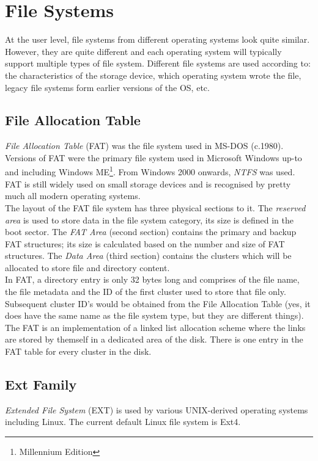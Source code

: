 \section{File Systems}
At the user level, file systems from different operating systems look quite similar. However, they are quite different and each operating system will typically support multiple types of file system. Different file systems are used according to: the characteristics of the storage device, which operating system wrote the file, legacy file systems form earlier versions of the OS, etc.

\subsection{File Allocation Table}
\textit{File Allocation Table} (FAT) was the file system used in MS-DOS (c.1980). Versions of FAT were the primary file system used in Microsoft Windows up-to and including Windows ME\footnote{Millennium Edition}. From Windows 2000 onwards, \textit{NTFS} was used. FAT is still widely used on small storage devices and is recognised by pretty much all modern operating systems.\\

The layout of the FAT file system has three physical sections to it. The \textit{reserved area} is used to store data in the file system category, its size is defined in the boot sector. The \textit{FAT Area} (second section) contains the primary and backup FAT structures; its size is calculated based on the number and size of FAT structures. The \textit{Data Area} (third section) contains the clusters which will be allocated to store file and directory content.\\

In FAT, a directory entry is only 32 bytes long and comprises of the file name, the file metadata and the ID of the first cluster used to store that file only. Subsequent cluster ID's would be obtained from the File Allocation Table (yes, it does have the same name as the file system type, but they are different things). The FAT is an implementation of a linked list allocation scheme where the links are stored by themself in a dedicated area of the disk. There is one entry in the FAT table for every cluster in the disk.

\subsection{Ext Family}
\textit{Extended File System} (EXT) is used by various UNIX-derived operating systems including Linux. The current default Linux file system is Ext4.\\

